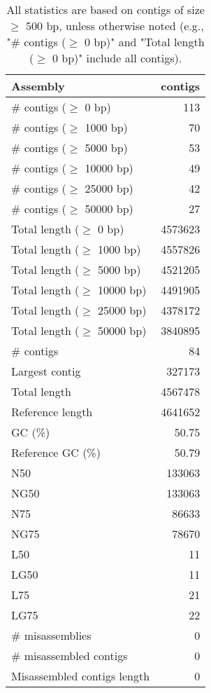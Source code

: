 \documentclass[12pt,a4paper]{article}
\begin{document}
\begin{table}[ht]
\begin{center}
\caption{All statistics are based on contigs of size $\geq$ 500 bp, unless otherwise noted (e.g., "\# contigs ($\geq$ 0 bp)" and "Total length ($\geq$ 0 bp)" include all contigs).}
\begin{tabular}{|l*{1}{|r}|}
\hline
Assembly & contigs \\ \hline
\# contigs ($\geq$ 0 bp) & 113 \\ \hline
\# contigs ($\geq$ 1000 bp) & 70 \\ \hline
\# contigs ($\geq$ 5000 bp) & 53 \\ \hline
\# contigs ($\geq$ 10000 bp) & 49 \\ \hline
\# contigs ($\geq$ 25000 bp) & 42 \\ \hline
\# contigs ($\geq$ 50000 bp) & 27 \\ \hline
Total length ($\geq$ 0 bp) & 4573623 \\ \hline
Total length ($\geq$ 1000 bp) & 4557826 \\ \hline
Total length ($\geq$ 5000 bp) & 4521205 \\ \hline
Total length ($\geq$ 10000 bp) & 4491905 \\ \hline
Total length ($\geq$ 25000 bp) & 4378172 \\ \hline
Total length ($\geq$ 50000 bp) & 3840895 \\ \hline
\# contigs & 84 \\ \hline
Largest contig & 327173 \\ \hline
Total length & 4567478 \\ \hline
Reference length & 4641652 \\ \hline
GC (\%) & 50.75 \\ \hline
Reference GC (\%) & 50.79 \\ \hline
N50 & 133063 \\ \hline
NG50 & 133063 \\ \hline
N75 & 86633 \\ \hline
NG75 & 78670 \\ \hline
L50 & 11 \\ \hline
LG50 & 11 \\ \hline
L75 & 21 \\ \hline
LG75 & 22 \\ \hline
\# misassemblies & 0 \\ \hline
\# misassembled contigs & 0 \\ \hline
Misassembled contigs length & 0 \\ \hline

\end{tabular}
\end{center}
\end{table}
\end{document}
